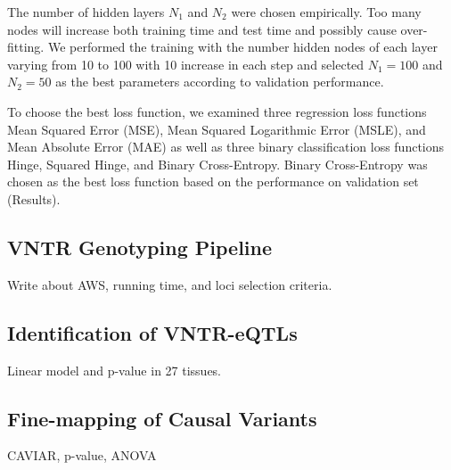 The number of hidden layers $N_1$ and $N_2$ were chosen empirically. Too many nodes will increase both training time and test time and possibly cause over-fitting. We performed the training with the number hidden nodes of each layer varying from 10 to 100 with 10 increase in each step and selected $N_1=100$ and $N_2=50$ as the best parameters according to validation performance.

To choose the best loss function, we examined three regression loss functions Mean Squared Error (MSE), Mean Squared Logarithmic Error (MSLE), and Mean Absolute Error (MAE) as well as three binary classification loss functions Hinge, Squared Hinge, and Binary Cross-Entropy. Binary Cross-Entropy was chosen as the best loss function based on the performance on validation set (Results).

\subsection{VNTR Genotyping Pipeline}
Write about AWS, running time, and loci selection criteria.

\subsection{Identification of VNTR-eQTLs}
Linear model and p-value in 27 tissues.

\subsection{Fine-mapping of Causal Variants}
CAVIAR, p-value, ANOVA
